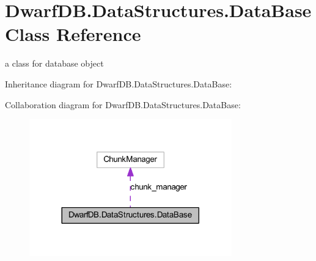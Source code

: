 \hypertarget{class_dwarf_d_b_1_1_data_structures_1_1_data_base}{\section{Dwarf\+D\+B.\+Data\+Structures.\+Data\+Base Class Reference}
\label{class_dwarf_d_b_1_1_data_structures_1_1_data_base}
}


a class for database object  




Inheritance diagram for Dwarf\+D\+B.\+Data\+Structures.\+Data\+Base\+:


Collaboration diagram for Dwarf\+D\+B.\+Data\+Structures.\+Data\+Base\+:\nopagebreak
\begin{figure}[H]
\begin{center}
\leavevmode
\includegraphics[width=248pt]{class_dwarf_d_b_1_1_data_structures_1_1_data_base__coll__graph}
\end{center}
\end{figure}

